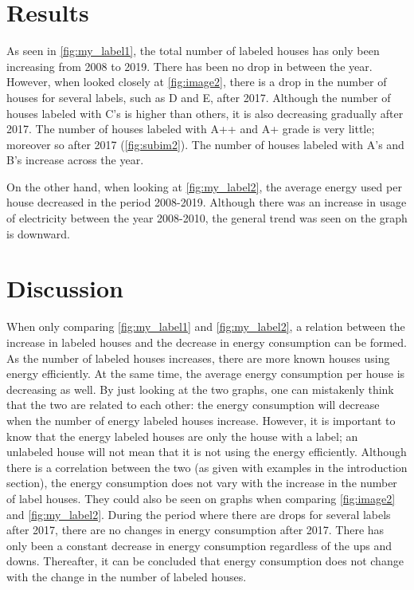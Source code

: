 \documentclass[a4paper,11pt]{article}
\begin{document}
\section{Results}
As seen in \autoref{fig:my_label1}, the total number of labeled houses has only been increasing from 2008 to 2019. There has been no drop in between the year. However, when looked closely at \autoref{fig:image2}, there is a drop in the number of houses for several labels, such as D and E, after 2017. Although the number of houses labeled with C's is higher than others, it is also decreasing gradually after 2017.  The number of houses labeled with A++ and A+ grade is very little; moreover so after 2017 (\autoref{fig:subim2}). The number of houses labeled with A's and B's increase across the year. 

On the other hand, when looking at \autoref{fig:my_label2}, the average energy used per house decreased in the period 2008-2019. Although there was an increase in usage of electricity between the year 2008-2010, the general trend was seen on the graph is downward. 


\section{Discussion}

When only comparing \autoref{fig:my_label1} and \autoref{fig:my_label2}, a relation between the increase in labeled houses and the decrease in energy consumption can be formed. As the number of labeled houses increases, there are more known houses using energy efficiently. At the same time, the average energy consumption per house is decreasing as well. By just looking at the two graphs, one can mistakenly think that the two are related to each other: the energy consumption will decrease when the number of energy labeled houses increase. However, it is important to know that the energy labeled houses are only the house with a label; an unlabeled house will not mean that it is not using the energy efficiently. Although there is a correlation between the two (as given with examples in the introduction section), the energy consumption does not vary with the increase in the number of label houses. They could also be seen on graphs when comparing \autoref{fig:image2} and \autoref{fig:my_label2}. During the period where there are drops for several labels after 2017, there are no changes in energy consumption after 2017. There has only been a constant decrease in energy consumption regardless of the ups and downs. Thereafter, it can be concluded that energy consumption does not change with the change in the number of labeled houses. 
\end{document}
